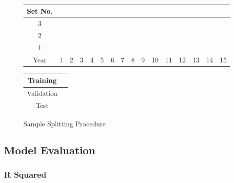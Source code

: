 \documentclass[a4paper, table]{article}
\begin{document}
\begin{figure}
	\begin{center}
		\begin{tabular}{|c|p{0.25cm}p{0.25cm}p{0.25cm}p{0.25cm}p{0.25cm}p{0.25cm}p{0.25cm}p{0.25cm}p{0.25cm}p{0.25cm}p{0.25cm}p{0.25cm}|p{0.25cm}p{0.25cm}p{0.25cm}|}
			\hline
			Set No. &&&&&&&&&&&&&&& \\
			\hline
			3 & \cellcolor{cyan} & \cellcolor{cyan} & \cellcolor{cyan} & \cellcolor{cyan} & \cellcolor{cyan} & \cellcolor{cyan} & \cellcolor{cyan} & \cellcolor{cyan} & \cellcolor{cyan} & \cellcolor{cyan} & \cellcolor{cyan} &
			\cellcolor{pink} & 
			\cellcolor{olive} & \cellcolor{olive} &	\cellcolor{olive} \\
			2 & \cellcolor{cyan} & \cellcolor{cyan} & \cellcolor{cyan} & \cellcolor{cyan} & \cellcolor{cyan} & \cellcolor{cyan} & \cellcolor{cyan} & \cellcolor{cyan} & \cellcolor{cyan} & \cellcolor{cyan} &
			\cellcolor{pink} & 
			\cellcolor{olive} & \cellcolor{olive} &	\cellcolor{olive} & \cellcolor{olive} \\
			1 & \cellcolor{cyan} & \cellcolor{cyan} & \cellcolor{cyan} & \cellcolor{cyan} & \cellcolor{cyan} & \cellcolor{cyan} & \cellcolor{cyan} & \cellcolor{cyan} & \cellcolor{cyan} &
			\cellcolor{pink} & 
			\cellcolor{olive} & \cellcolor{olive} &	\cellcolor{olive} & \cellcolor{olive} & \cellcolor{olive} \\
			\hline
			Year & 1 & 2 & 3 & 4 & 5 & 6 & 7 & 8 & 9 & 10 & 11 & 12 & 13 & 14 & 15\\
			\hline
		\end{tabular}
		\medskip
		\begin{tabular}{|c|p{0.25cm}|}
			\hline
			Training & \cellcolor{cyan} \\
			\hline
			Validation & \cellcolor{pink} \\
			\hline
			Test & \cellcolor{olive} \\
			\hline
		\end{tabular}
	\end{center}
	\caption{Sample Splitting Procedure}
	\label{sample_split_diag}
\end{figure}

\subsection{Model Evaluation}
\label{model_evaluation}

\subsubsection{R Squared}
\end{document}
